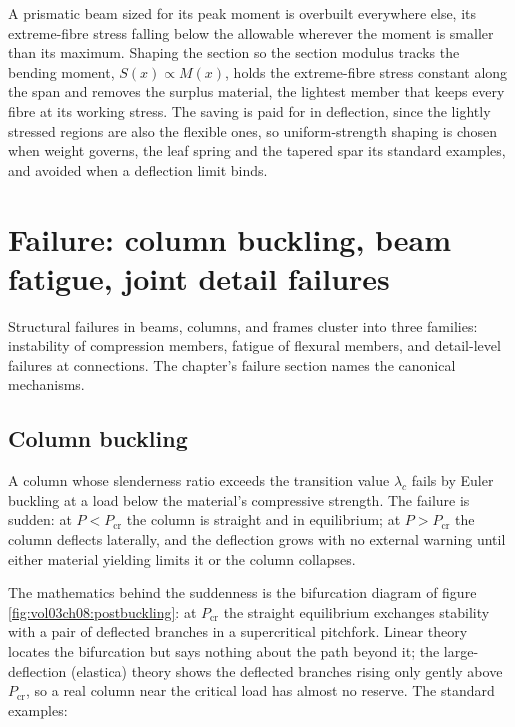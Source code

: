 

\begin{principle}
A prismatic beam sized for its peak moment is overbuilt everywhere else,
its extreme-fibre stress falling below the allowable wherever the moment is
smaller than its maximum. Shaping the section so the section modulus tracks
the bending moment, $S(x) \propto M(x)$, holds the extreme-fibre stress
constant along the span and removes the surplus material, the lightest
member that keeps every fibre at its working stress. The saving is paid for
in deflection, since the lightly stressed regions are also the flexible
ones, so uniform-strength shaping is chosen when weight governs, the leaf
spring and the tapered spar its standard examples, and avoided when a
deflection limit binds.
\end{principle}

\section{Failure: column buckling, beam fatigue, joint detail
failures}

Structural failures in beams, columns, and frames cluster into
three families: instability of compression members, fatigue of
flexural members, and detail-level failures at connections. The
chapter's failure section names the canonical mechanisms.

\subsection{Column buckling}

A column whose slenderness ratio exceeds the transition value
$\lambda_c$ fails by Euler buckling at a load below the material's
compressive strength. The failure is sudden: at $P < P_{\text{cr}}$
the column is straight and in equilibrium; at $P > P_{\text{cr}}$
the column deflects laterally, and the deflection grows with no
external warning until either material yielding limits it or the
column collapses.



The mathematics behind the suddenness is the bifurcation diagram of
figure \ref{fig:vol03ch08:postbuckling}: at $P_{\text{cr}}$ the
straight equilibrium exchanges stability with a pair of deflected
branches in a supercritical pitchfork. Linear theory locates the
bifurcation but says nothing about the path beyond it; the
large-deflection (elastica) theory shows the deflected branches rising
only gently above $P_{\text{cr}}$, so a real column near the critical
load has almost no reserve. The standard examples:

